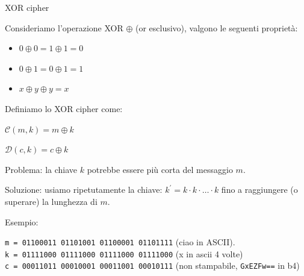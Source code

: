 \documentclass[xcolor=dvipsnames,aspectratio=169]{beamer}
\begin{document}
\begin{frame}{XOR cipher}

  Consideriamo l'operazione XOR $\oplus$ (or esclusivo), valgono le seguenti proprietà:
  
  \begin{itemize}
    \item $0 \oplus 0 = 1 \oplus 1 = 0$ 
    \item $0 \oplus 1 = 0 \oplus 1 = 1$ 
    \item $x \oplus y \oplus y = x$ 
  \end{itemize}
  
  \medskip
  \pause
  
  Definiamo lo XOR cipher come:
    
  $\mathcal{C}(m, k) = m \oplus k$ 
  
  $\mathcal{D}(c, k) = c \oplus k$

  \medskip
  
  \pause

  Problema: la chiave $k$ potrebbe essere più corta del messaggio $m$.
  
  Soluzione: usiamo ripetutamente la chiave: $k^{'} = k \cdot k \cdot \ldots \cdot k$ fino a raggiungere (o superare) la lunghezza di $m$.

  \medskip
  \pause
  
  Esempio:
  
  \texttt{m = 01100011 01101001 01100001 01101111} (ciao in ASCII).\\
  \texttt{k = 01111000 01111000 01111000 01111000} (x in ascii 4 volte)\\
  \texttt{c = 00011011 00010001 00011001 00010111} (non stampabile, \texttt{GxEZFw==} in b4)
  
  
\end{frame}
\end{document}

